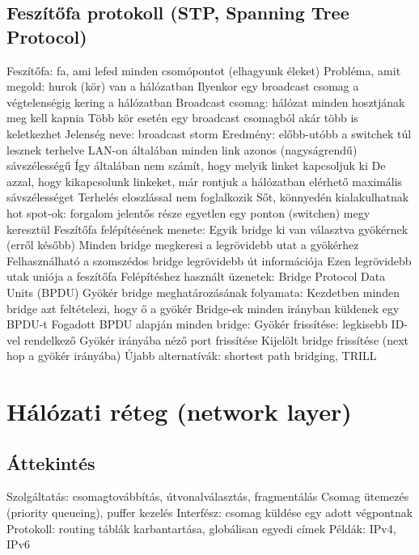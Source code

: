 \documentclass[12pt,a4paper]{article}
\begin{document}
\pagebreak

\subsection{Feszítőfa protokoll (STP, Spanning Tree Protocol)}

\begin{outline}
	\1 Feszítőfa: fa, ami lefed minden csomópontot (elhagyunk éleket)
	\1 Probléma, amit megold: hurok (kör) van a hálózatban
		\2 Ilyenkor egy broadcast csomag a végtelenségig kering a hálózatban
			\3 Broadcast csomag: hálózat minden hosztjának meg kell kapnia
		\2 Több kör esetén egy broadcast csomagból akár több is keletkezhet
		\2 Jelenség neve: broadcast storm
		\2 Eredmény: előbb-utóbb a switchek túl lesznek terhelve
	\1 LAN-on általában minden link azonos (nagyságrendű) sávszélességű
		\2 Így általában nem számít, hogy melyik linket kapcsoljuk ki
		\2 De azzal, hogy kikapcsolunk linkeket, már rontjuk a hálózatban elérhető maximális sávszélességet
	\1 Terhelés eloszlással nem foglalkozik
		\2 Sőt, könnyedén kialakulhatnak hot spot-ok: forgalom jelentős része egyetlen egy ponton (switchen) megy keresztül
	\1 Feszítőfa felépítésének menete:
		\2 Egyik bridge ki van választva gyökérnek (erről később)
		\2 Minden bridge megkeresi a legrövidebb utat a gyökérhez
			\3 Felhasználható a szomszédos bridge legrövidebb út információja
		\2 Ezen legrövidebb utak uniója a feszítőfa
	\1 Felépítéshez használt üzenetek: Bridge Protocol Data Units (BPDU)
	\1 Gyökér bridge meghatározásának folyamata:
		\2 Kezdetben minden bridge azt feltételezi, hogy ő a gyökér
		\2 Bridge-ek minden irányban küldenek egy BPDU-t
		\2 Fogadott BPDU alapján minden bridge:
			\3 Gyökér frissítése: legkisebb ID-vel rendelkező
			\3 Gyökér irányába néző port frissítése
			\3 Kijelölt bridge frissítése (next hop a gyökér irányába)
	\1 Újabb alternatívák: shortest path bridging, TRILL
\end{outline}

\pagebreak

\section{Hálózati réteg (network layer)}

\subsection{Áttekintés}

\begin{outline}
	\1 Szolgáltatás: csomagtovábbítás, útvonalválasztás, fragmentálás
		\2 Csomag ütemezés (priority queueing), puffer kezelés
	\1 Interfész: csomag küldése egy adott végpontnak
	\1 Protokoll: routing táblák karbantartása, globálisan egyedi címek
	\1 Példák: IPv4, IPv6
\end{outline}
\end{document}
